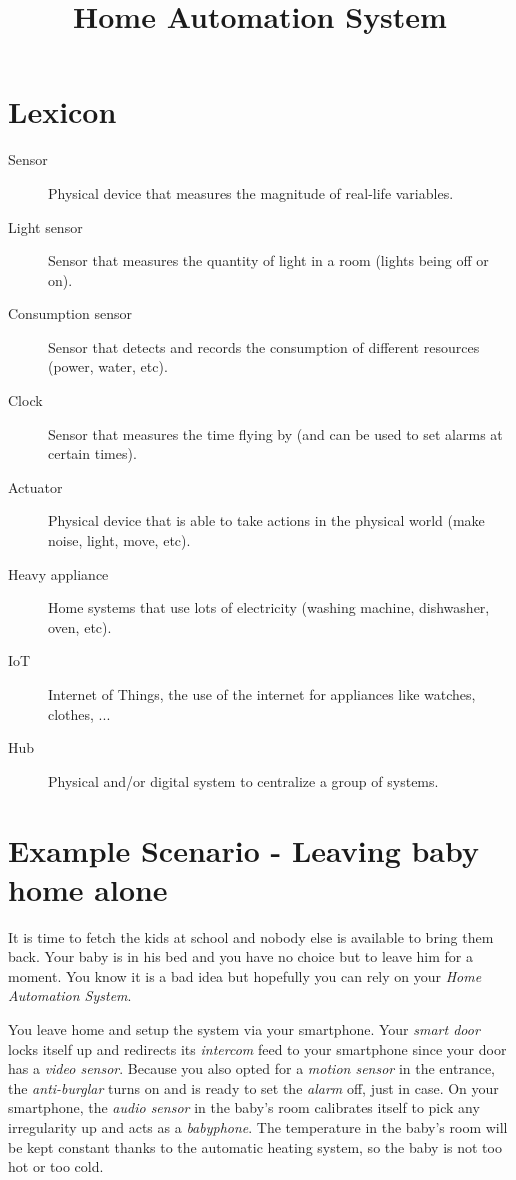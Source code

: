     \title{Home Automation System}
    \newpage

    \section{Lexicon}
        \begin{description}
            \item[Sensor] Physical device that measures the magnitude of real-life variables.
            \item[Light sensor] Sensor that measures the quantity of light in a room (lights being off or on).
            \item[Consumption sensor] Sensor that detects and records the consumption of different resources (power, water, etc).
            \item[Clock] Sensor that measures the time flying by (and can be used to set alarms at certain times).
            \item[Actuator] Physical device that is able to take actions in the physical world (make noise, light, move, etc).
            \item[Heavy appliance] Home systems that use lots of electricity (washing machine, dishwasher, oven, etc).
            \item[IoT] Internet of Things, the use of the internet for appliances like watches, clothes, ...
            \item[Hub] Physical and/or digital system to centralize a group of systems.
        \end{description}

    \section{Example Scenario - Leaving baby home alone}
      It is time to fetch the kids at school and nobody else is available to bring them back. Your baby is in his bed and you have no choice but to leave him for a moment. You know it is a bad idea but hopefully you can rely on your \emph{Home Automation System}.

      You leave home and setup the system via your smartphone. Your \emph{smart door} locks itself up and redirects its \emph{intercom} feed to your smartphone since your door has a \emph{video sensor}. Because you also opted for a \emph{motion sensor} in the entrance, the \emph{anti-burglar} turns on and is ready to set the \emph{alarm} off, just in case. On your smartphone, the \emph{audio sensor} in the baby's room calibrates itself to pick any irregularity up and acts as a \emph{babyphone}. The temperature in the baby's room will be kept constant thanks to the automatic heating system, so the baby is not too hot or too cold.

